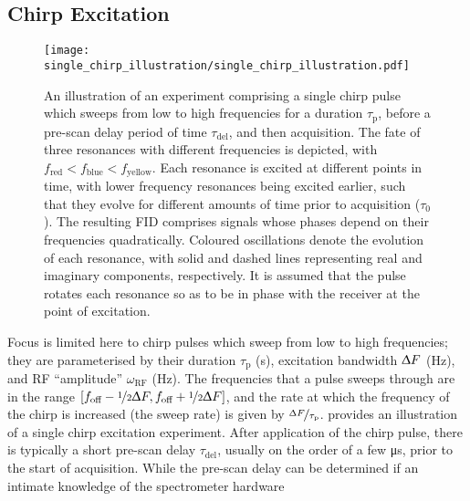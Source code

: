\subsection{Chirp Excitation}
\begin{figure}
    \centering
    \texttt{[image: single\_chirp\_illustration/single\_chirp\_illustration.pdf]}
    \caption[
        The evolution of resonances of different frequencies during an
        experiment comprising a single chirp pulse of \ang{90} flip angle.
    ]
    {
        An illustration of an experiment comprising a single chirp pulse \label{corr:ninty-flip} which sweeps from
        low to high frequencies for a duration $\tau_{\text{p}}$, before
        a pre-scan delay period of time $\tau_{\text{del}}$, and then
        acquisition. The fate of three resonances with different frequencies is
        depicted, with $f_{\text{red}} < f_{\text{blue}} <
        f_{\text{yellow}}$. Each resonance is excited at different points
        in time, with lower frequency resonances being excited earlier, such that
        they evolve for different amounts of time prior to acquisition ($\tau_0$).
        The resulting \ac{FID} comprises signals whose phases depend on their
        frequencies quadratically.
        Coloured oscillations denote the evolution of each resonance, with
        solid and dashed lines representing real and imaginary components,
        respectively. It is assumed that the pulse rotates each
        resonance so as to be in phase with the receiver at the point of
        excitation.
    }
    \label{fig:single-chirp}
\end{figure}
Focus is limited here to chirp pulses which sweep from low to high
frequencies; they are parameterised by
their duration $\tau_{\text{p}}$ (\unit{\second}),
excitation bandwidth $\Updelta F$ (\unit{\hertz}),
and \ac{RF} ``amplitude'' $\omega_{\text{RF}}$ (\unit{\hertz}).
The frequencies that a pulse sweeps through are in the range
$[f_{\text{off}} - \nicefrac{1}{2} \Updelta F,
f_{\text{off}} + \nicefrac{1}{2} \Updelta F]$,
and the rate at which the frequency of the chirp is increased (the sweep
rate) is given by $\nicefrac{\Updelta F}{\tau_{\text{p}}}$.
 provides an illustration of a single chirp
excitation experiment. After application of the chirp pulse, there is typically
a short pre-scan delay $\tau_{\text{del}}$, usually on the order of a few
\unit{\micro\second}, prior to the start of acquisition. While the pre-scan
delay can be determined if an intimate knowledge of the spectrometer hardware
